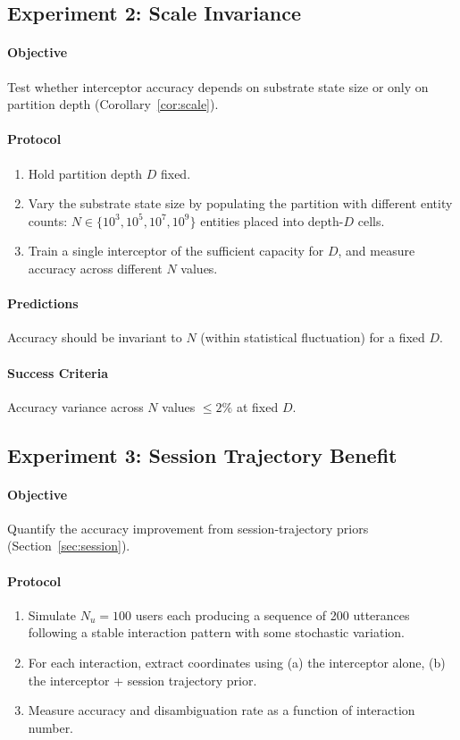 \documentclass[11pt,a4paper]{article}
\theoremstyle{definition}
\theoremstyle{remark}
\begin{document}
\subsection{Experiment 2: Scale Invariance}

\paragraph{Objective} Test whether interceptor accuracy depends on substrate state size or only on partition depth (Corollary~\ref{cor:scale}).

\paragraph{Protocol}
\begin{enumerate}
    \item Hold partition depth $D$ fixed.
    \item Vary the substrate state size by populating the partition with different entity counts: $N \in \{10^3, 10^5, 10^7, 10^9\}$ entities placed into depth-$D$ cells.
    \item Train a single interceptor of the sufficient capacity for $D$, and measure accuracy across different $N$ values.
\end{enumerate}

\paragraph{Predictions}
Accuracy should be invariant to $N$ (within statistical fluctuation) for a fixed $D$.

\paragraph{Success Criteria}
Accuracy variance across $N$ values $\leq 2\%$ at fixed $D$.

\subsection{Experiment 3: Session Trajectory Benefit}

\paragraph{Objective} Quantify the accuracy improvement from session-trajectory priors (Section~\ref{sec:session}).

\paragraph{Protocol}
\begin{enumerate}
    \item Simulate $N_u = 100$ users each producing a sequence of 200 utterances following a stable interaction pattern with some stochastic variation.
    \item For each interaction, extract coordinates using (a) the interceptor alone, (b) the interceptor + session trajectory prior.
    \item Measure accuracy and disambiguation rate as a function of interaction number.
\end{enumerate}
\end{document}
